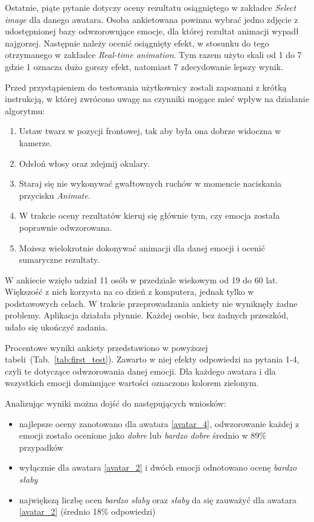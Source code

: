Ostatnie, piąte pytanie dotyczy oceny rezultatu osiągniętego w zakładce \textit{Select image} dla danego awatara. Osoba ankietowana powinna wybrać jedno zdjęcie z udostępnionej bazy odwzorowujące emocje, dla której rezultat animacji wypadł najgorzej. Następnie należy ocenić osiągnięty efekt, w stosunku do tego otrzymanego w zakładce \textit{Real-time animation}. Tym razem użyto skali od 1 do 7 gdzie 1 oznacza dużo gorszy efekt, natomiast 7 zdecydowanie lepszy wynik.

Przed przystąpieniem do testowania użytkownicy zostali zapoznani z krótką instrukcją, w której zwrócono uwagę na czynniki mogące mieć wpływ na działanie algorytmu:

\begin{enumerate}
    \item Ustaw twarz w pozycji frontowej, tak aby była ona dobrze widoczna w kamerze.
    \item Odsłoń włosy oraz zdejmij okulary.
    \item Staraj się nie wykonywać gwałtownych ruchów w momencie naciskania przycisku \textit{Animate}.
    \item W trakcie oceny rezultatów kieruj się głównie tym, czy emocja została poprawnie odwzorowana.
    \item Możesz wielokrotnie dokonywać animacji dla danej emocji i ocenić sumaryczne rezultaty.
\end{enumerate}

W ankiecie wzięło udział 11 osób w przedziale wiekowym od 19 do 60 lat. Większość z nich korzysta na co dzień z komputera, jednak tylko w podstawowych celach. W trakcie przeprowadzania ankiety nie wyniknęły żadne problemy. Aplikacja działała płynnie. Każdej osobie, bez żadnych przeszkód, udało się ukończyć zadania.

Procentowe wyniki ankiety przedstawiono w powyższej tabeli~(Tab.~\ref{tab:first_test}). Zawarto w niej efekty odpowiedzi na pytania 1-4, czyli te dotyczące odwzorowania danej emocji. Dla każdego awatara i dla wszystkich emocji dominujące wartości oznaczono kolorem zielonym. 

Analizując wyniki można dojść do następujących wniosków:
\begin{itemize}
    \item najlepsze oceny zanotowano dla awatara \ref{avatar_4}, odwzorowanie każdej z emocji zostało ocenione jako \textit{dobre} lub \textit{bardzo dobre} średnio w 89\% przypadków
    \item wyłącznie dla awatara \ref{avatar_2} i dwóch emocji odnotowano ocenę \textit{bardzo słaby}
    \item największą liczbę ocen \textit{bardzo słaby} oraz \textit{słaby} da się zauważyć dla awatara \ref{avatar_2} (średnio 18\% odpowiedzi)
\end{itemize}

